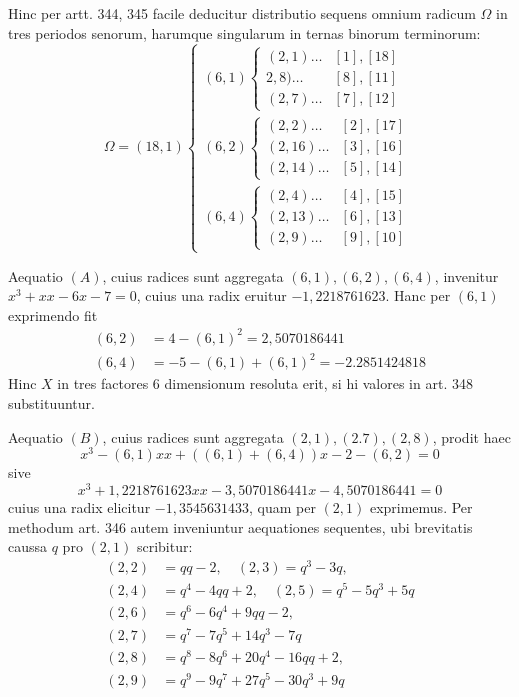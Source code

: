 Hinc per artt. 344, 345 facile deducitur distributio sequens omnium radicum \(\Omega\) in tres periodos senorum, harumque singularum in ternas binorum terminorum: \[\Omega=(18,1)\left\{\begin{array}{l}(6,1)\left\{\begin{array}{ll}(2,1)\ldots&[1],[18]\\2,8)\ldots&[8],[11]\\(2,7)\ldots&[7],[12]\end{array}\right.\\[8pt](6,2)\left\{\begin{array}{ll}(2,2)\ldots&[2],[17]\\(2,16)\ldots&[3],[16]\\(2,14)\ldots&[5],[14]\end{array}\right.\\[8pt](6,4)\left\{\begin{array}{ll}(2,4)\ldots&[4],[15]\\(2,13)\ldots&[6],[13]\\(2,9)\ldots&[9],[10]\end{array}\right.\end{array}\right.\]

Aequatio \((A)\), cuius radices sunt aggregata \((6,1),\allowbreak (6,2),\allowbreak (6,4)\), invenitur \(x^3+xx-6x-7=0\), cuius una radix eruitur \(-1{,}2218761623\). Hanc per \((6,1)\) exprimendo fit
\[\begin{aligned}(6,2)&=4-(6,1)^2=2{,}5070186441\\(6,4)&=-5-(6,1)+(6,1)^2=-2.2851424818\end{aligned}\] Hinc \(X\) in tres factores 6 dimensionum resoluta erit, si hi valores in art. 348 substituuntur.

Aequatio \((B)\), cuius radices sunt aggregata \((2,1),\allowbreak (2.7),\allowbreak (2,8)\), prodit haec \[x^3-(6,1)xx+((6,1)+(6,4))x-2-(6,2)=0\] sive \[x^3+1{,}2218761623xx-3{,}5070186441x-4{,}5070186441=0\] cuius una radix elicitur \(-1{,}3545631433\), quam per \((2,1)\) exprimemus. Per methodum art. 346 autem inveniuntur aequationes sequentes, ubi brevitatis caussa \(q\) pro \((2,1)\) scribitur: \[\begin{aligned}
(2,2)&=qq-2,\quad (2,3)=q^3-3q,\\
(2,4)&=q^4-4qq+2,\quad (2,5)=q^5-5q^3+5q\\
(2,6)&=q^6-6q^4+9qq-2,\\
(2,7)&=q^7-7q^5+14q^3-7q\\
(2,8)&=q^8-8q^6+20q^4-16qq+2,\\
(2,9)&=q^9-9q^7+27q^5-30q^3+9q
\end{aligned}\]

